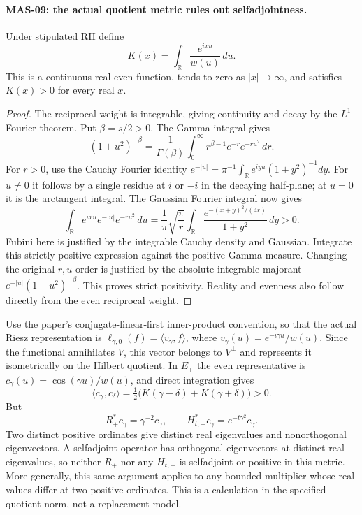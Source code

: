 \documentclass[11pt,a4paper]{article}
\newcommand{\R}{\mathbb R}
\begin{document}
\paragraph{MAS-09: the actual quotient metric rules out selfadjointness.}
Under stipulated RH define
\[
 K(x)=\int_\R\frac{e^{ixu}}{w(u)}\,du.
\]
This is a continuous real even function, tends to zero as $|x|\to\infty$, and satisfies $K(x)>0$ for every real $x$.
\begin{proof}
The reciprocal weight is integrable, giving continuity and decay by the $L^1$ Fourier theorem. Put $\beta=s/2>0$. The Gamma integral gives
\[
 (1+u^2)^{-\beta}
 =\frac1{\Gamma(\beta)}\int_0^\infty r^{\beta-1}e^{-r}e^{-ru^2}\,dr.
\]
For $r>0$, use the Cauchy Fourier identity
$e^{-|u|}=\pi^{-1}\int_\R e^{iyu}(1+y^2)^{-1}dy$. For $u\ne0$ it follows by a single residue at $i$ or $-i$ in the decaying half-plane; at $u=0$ it is the arctangent integral. The Gaussian Fourier integral now gives
\[
 \int_\R e^{ixu}e^{-|u|}e^{-ru^2}\,du
 =\frac1\pi\sqrt{\frac\pi r}
   \int_\R\frac{e^{-(x+y)^2/(4r)}}{1+y^2}\,dy>0.
\]
Fubini here is justified by the integrable Cauchy density and Gaussian. Integrate this strictly positive expression against the positive Gamma measure. Changing the original $r,u$ order is justified by the absolute integrable majorant
$e^{-|u|}(1+u^2)^{-\beta}$. This proves strict positivity. Reality and evenness also follow directly from the even reciprocal weight.
\end{proof}

Use the paper's conjugate-linear-first inner-product convention, so that the actual Riesz representation is $\ell_{\gamma,0}(f)=\langle v_\gamma,f\rangle$, where
$v_\gamma(u)=e^{-i\gamma u}/w(u)$. Since the functional annihilates $V$, this vector belongs to $V^\perp$ and represents it isometrically on the Hilbert quotient. In $E_+$ the even representative is
$c_\gamma(u)=\cos(\gamma u)/w(u)$, and direct integration gives
\begin{equation}\label{eq:MasActualCorrelation}
 \langle c_\gamma,c_\delta\rangle
 =\tfrac12\bigl(K(\gamma-\delta)+K(\gamma+\delta)\bigr)>0.
\end{equation}
But
\[
 R_+^*c_\gamma=\gamma^{-2}c_\gamma,\qquad
 H_{t,+}^*c_\gamma=e^{-t\gamma^2}c_\gamma.
\]
Two distinct positive ordinates give distinct real eigenvalues and nonorthogonal eigenvectors. A selfadjoint operator has orthogonal eigenvectors at distinct real eigenvalues, so neither $R_+$ nor any $H_{t,+}$ is selfadjoint or positive in this metric. More generally, this same argument applies to any bounded multiplier whose real values differ at two positive ordinates. This is a calculation in the specified quotient norm, not a replacement model.
\end{document}
